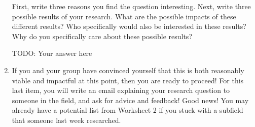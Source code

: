 \documentclass[letterpaper,11pt]{article}
\begin{document}
\begin{enumerate}
First, write three reasons you find the question interesting. Next, write three possible results of your research. What are the possible impacts of these different results? Who specifically would also be interested in these results? \\

Why do you specifically care about these possible results?\\
\begin{tcolorbox}
TODO: Your answer here
\newline
\newline
\newline
\newline
\newline
\newline
\newline
\newline
\newline
\newline
\newline
\newline
\newline
\newline
\newline
\newline
\newline
\newline
\newline
\newline
\newline
\newline
\newline
\newline
\newline
\newline
\newline
\newline
\newline
\newline
\newline
\newline
\newline
\newline
\newline
\newline
\newline
\end{tcolorbox}
\item
If you and your group have convinced yourself that this is both reasonably viable and impactful at this point, then you are ready to proceed! For this last item, you will write an email explaining your research question to someone in the field, and ask for advice and feedback! Good news! You may already have a potential list from Worksheet 2 if you stuck with a subfield that someone last week researched. \\

\end{enumerate}
\end{document}
